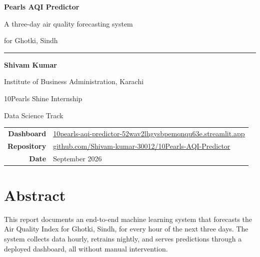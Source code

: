 \documentclass[11pt,a4paper]{article}
\begin{document}
\begin{titlepage}
\centering
\vspace*{3.2cm}

{\Huge\bfseries\color{ink} Pearls AQI Predictor\par}
\vspace{0.5cm}
{\Large\color{muted} A three-day air quality forecasting system\par}
{\Large\color{muted} for Ghotki, Sindh\par}

\vspace{1.6cm}
{\color{rule}\rule{0.45\textwidth}{0.8pt}}
\vspace{1.6cm}

{\large\bfseries\color{ink} Shivam Kumar\par}
\vspace{0.25cm}
{\normalsize\color{muted} Institute of Business Administration, Karachi\par}

\vspace{1.1cm}

{\large 10Pearls Shine Internship\par}
{\large Data Science Track\par}

\vspace{2cm}

\begin{tabular}{rl}
\textbf{Dashboard} & \href{https://10pearls-aqi-predictor-52wav2lhgysbpemqnqu63e.streamlit.app/}{\small 10pearls-aqi-predictor-52wav2lhgysbpemqnqu63e.streamlit.app} \\[5pt]
\textbf{Repository} & \href{https://github.com/Shivam-kumar-30012/10Pearls-AQI-Predictor}{\small github.com/Shivam-kumar-30012/10Pearls-AQI-Predictor} \\[5pt]
\textbf{Date} & \small September 2026 \\
\end{tabular}

\vfill
\end{titlepage}


\section*{Abstract}

This report documents an end-to-end machine learning system that
forecasts the Air Quality Index for Ghotki, Sindh, for every hour of the
next three days. The system collects data hourly, retrains nightly, and
serves predictions through a deployed dashboard, all without manual
intervention.
\end{document}
